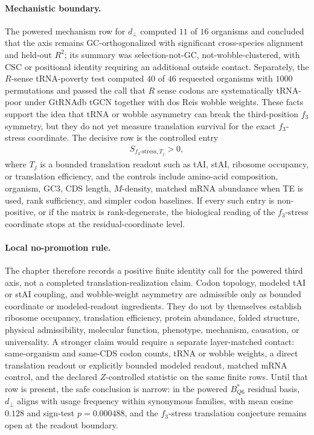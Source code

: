 \paragraph{Mechanistic boundary.}
The powered mechanism row for $d_\perp$ computed $11$ of $16$ organisms and concluded that the axis remains GC-orthogonalized with significant cross-species alignment and held-out $R^2$; its summary was selection-not-GC, not-wobble-clustered, with CSC or positional identity requiring an additional outside contact.  Separately, the $R$-sense tRNA-poverty test computed $40$ of $46$ requested organisms with $1000$ permutations and passed the call that $R$ sense codons are systematically tRNA-poor under GtRNAdb tGCN together with dos Reis wobble weights.  These facts support the idea that tRNA or wobble asymmetry can break the third-position $f_3$ symmetry, but they do not yet measure translation survival for the exact $f_3$-stress coordinate.  The decisive row is the controlled entry
$$\begin{aligned}
S_{f_3\text{-stress},T_j} > 0,
\end{aligned}$$
where $T_j$ is a bounded translation readout such as tAI, stAI, ribosome occupancy, or translation efficiency, and the controls include amino-acid composition, organism, GC3, CDS length, $M$-density, matched mRNA abundance when TE is used, rank sufficiency, and simpler codon baselines.  If every such entry is non-positive, or if the matrix is rank-degenerate, the biological reading of the $f_3$-stress coordinate stops at the residual-coordinate level.

\paragraph{Local no-promotion rule.}
The chapter therefore records a positive finite identity call for the powered third axis, not a completed translation-realization claim.  Codon topology, modeled tAI or stAI coupling, and wobble-weight asymmetry are admissible only as bounded coordinate or modeled-readout ingredients.  They do not by themselves establish ribosome occupancy, translation efficiency, protein abundance, folded structure, physical admissibility, molecular function, phenotype, mechanism, causation, or universality.  A stronger claim would require a separate layer-matched contact: same-organism and same-CDS codon counts, tRNA or wobble weights, a direct translation readout or explicitly bounded modeled readout, matched mRNA control, and the declared $Z$-controlled statistic on the same finite rows.  Until that row is present, the safe conclusion is narrow: in the powered $B^*_{Q6}$ residual basis, $d_\perp$ aligns with usage frequency within synonymous families, with mean cosine $0.128$ and sign-test $p=0.000488$, and the $f_3$-stress translation conjecture remains open at the readout boundary.